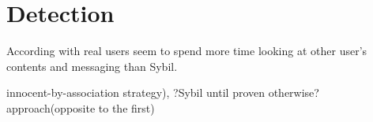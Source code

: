 \documentclass[runningheads,a4paper]{llncs}
\begin{document}


\section{Detection}
According with \cite{ferrara:2015} real users seem to spend more time looking at other user's contents and messaging than Sybil.

innocent-by-association strategy), ?Sybil until proven otherwise? approach(opposite to the first)\cite{ferrara:2015}










\end{document}
